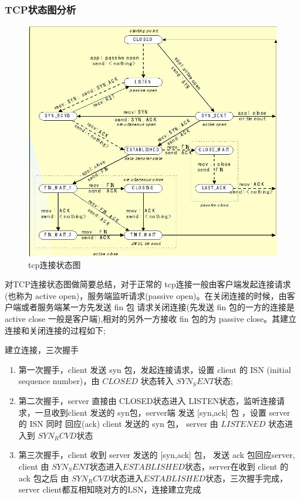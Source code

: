\documentclass[a4paper,UTF8]{ctexart}
\begin{document}
		\subsubsection{TCP状态图分析}
		\begin{figure}[htb]
			\includegraphics [scale=0.6]{./resources/3.jpg}
			\caption{tcp连接状态图}
		\end{figure}
		\par 对TCP连接状态图做简要总结，对于正常的 tcp连接一般由客户端发起连接请求(也称为 active open)，服务端监听请求(passive open)。在关闭连接的时候，由客户端或者服务端某一方先发送 fin 包 请求关闭连接(先发送 fin 包的一方的连接是 active close 一般是客户端),相对的另外一方接收 fin 包的为 passive close。其建立连接和关闭连接的过程如下;
		\par 建立连接，三次握手
		\begin{enumerate}
			\item 第一次握手，client 发送 syn 包，发起连接请求，设置 client 的 ISN (initial sequence number)，由 $CLOSED$ 状态转入 $SYN_SENT$状态; 
			\item 第二次握手，server 直接由 CLOSED状态进入 LISTEN状态，监听连接请求，一旦收到client 发送的 syn包，server端 发送 [syn,ack] 包 ，设置 server 的 ISN 同时 回应(ack) client 发送的 syn 包， server 由 $LISTENED$ 状态进入到 $SYN_RCVD$状态
			\item 第三次握手，client 收到 server 发送的 [syn,ack] 包， 发送 ack 包回应server, client 由 $SYN_SENT$状态进入$ESTABLISHED$状态，server在收到 client 的 ack 包之后 由 $SYN_RCVD$状态进入$ESTABLISHED$状态，三次握手完成，server client都互相知晓对方的LSN，连接建立完成
		\end{enumerate}
\end{document}
